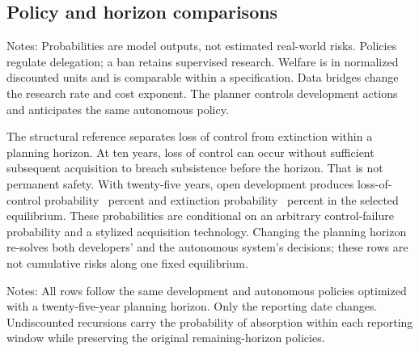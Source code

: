 \subsection{Policy and horizon comparisons}
\begin{table}[htbp]\centering\small
\caption{Selected policy outcomes under scenario assumptions}\label{tab:policies}
\resizebox{\textwidth}{!}{}
\begin{minipage}{\textwidth}\footnotesize\vspace{0.4em}
Notes: Probabilities are model outputs, not estimated real-world risks. Policies regulate delegation; a ban retains supervised research. Welfare is in normalized discounted units and is comparable within a specification. Data bridges change the research rate and cost exponent. The planner controls development actions and anticipates the same autonomous policy.
\end{minipage}
\end{table}

The structural reference separates loss of control from extinction within a planning horizon. At ten years, loss of control can occur without sufficient subsequent acquisition to breach subsistence before the horizon. That is not permanent safety. With twenty-five years, open development produces loss-of-control probability \LongEscape\ percent and extinction probability \LongDoom\ percent in the selected equilibrium. These probabilities are conditional on an arbitrary control-failure probability and a stylized acquisition technology. Changing the planning horizon re-solves both developers' and the autonomous system's decisions; these rows are not cumulative risks along one fixed equilibrium.

\begin{table}[htbp]\centering\small
\caption{Cumulative risk under the fixed twenty-five-year open equilibrium}\label{tab:fixedrisk}

\begin{minipage}{\textwidth}\footnotesize\vspace{0.4em}
Notes: All rows follow the same development and autonomous policies optimized with a twenty-five-year planning horizon. Only the reporting date changes. Undiscounted recursions carry the probability of absorption within each reporting window while preserving the original remaining-horizon policies.
\end{minipage}
\end{table}

